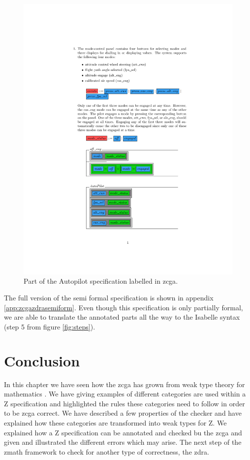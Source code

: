 \begin{figure}[H]
\centering
\includegraphics[clip, trim=3.5cm 10cm 1.5cm 2cm, scale=0.6]{examples/semiform/1.pdf}
\caption{Part of the Autopilot specification labelled in \gls{zcga}. \label{fig:zcgautopilot}}
\end{figure}

The full version of the semi formal specification is shown in appendix \ref{app:zcgazdrasemiform}. Even though this specification is only partially formal, we are able to translate the annotated parts all the way to the Isabelle syntax (step 5 from figure \ref{fig:steps}).

\section{Conclusion}
In this chapter we have seen how the \gls{zcga} has grown from weak type theory for mathematics \cite{wtt}. We have giving examples of different categories are used within a Z specification and highlighted the rules these categories need to follow in order to be \gls{zcga} correct. We have described a few properties of the checker and have explained how these categories are transformed into weak types for Z. We explained how a Z specification can be annotated and checked bu the \gls{zcga} and given and illustrated the different errors which may arise. The next step of the \gls{zmath} framework to check for another type of correctness, the \gls{zdra}.

